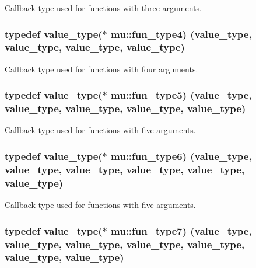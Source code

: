 Callback type used for functions with three arguments. 

\subsubsection[{\texorpdfstring{fun\+\_\+type4}{fun_type4}}]{\setlength{\rightskip}{0pt plus 5cm}typedef {\bf value\+\_\+type}($\ast$ mu\+::fun\+\_\+type4) ({\bf value\+\_\+type}, {\bf value\+\_\+type}, {\bf value\+\_\+type}, {\bf value\+\_\+type})}\hypertarget{namespacemu_ada318070796bde216079092cfdcf6fe1}{}\label{namespacemu_ada318070796bde216079092cfdcf6fe1}


Callback type used for functions with four arguments. 

\subsubsection[{\texorpdfstring{fun\+\_\+type5}{fun_type5}}]{\setlength{\rightskip}{0pt plus 5cm}typedef {\bf value\+\_\+type}($\ast$ mu\+::fun\+\_\+type5) ({\bf value\+\_\+type}, {\bf value\+\_\+type}, {\bf value\+\_\+type}, {\bf value\+\_\+type}, {\bf value\+\_\+type})}\hypertarget{namespacemu_a7a01724f9caaf71f99e46b49e75b3bc3}{}\label{namespacemu_a7a01724f9caaf71f99e46b49e75b3bc3}


Callback type used for functions with five arguments. 

\subsubsection[{\texorpdfstring{fun\+\_\+type6}{fun_type6}}]{\setlength{\rightskip}{0pt plus 5cm}typedef {\bf value\+\_\+type}($\ast$ mu\+::fun\+\_\+type6) ({\bf value\+\_\+type}, {\bf value\+\_\+type}, {\bf value\+\_\+type}, {\bf value\+\_\+type}, {\bf value\+\_\+type}, {\bf value\+\_\+type})}\hypertarget{namespacemu_a575003f957a2a77d757e24fd04139001}{}\label{namespacemu_a575003f957a2a77d757e24fd04139001}


Callback type used for functions with five arguments. 

\subsubsection[{\texorpdfstring{fun\+\_\+type7}{fun_type7}}]{\setlength{\rightskip}{0pt plus 5cm}typedef {\bf value\+\_\+type}($\ast$ mu\+::fun\+\_\+type7) ({\bf value\+\_\+type}, {\bf value\+\_\+type}, {\bf value\+\_\+type}, {\bf value\+\_\+type}, {\bf value\+\_\+type}, {\bf value\+\_\+type}, {\bf value\+\_\+type})}\hypertarget{namespacemu_aa03550a6f05b1270e1e27214a63301ee}{}\label{namespacemu_aa03550a6f05b1270e1e27214a63301ee}


